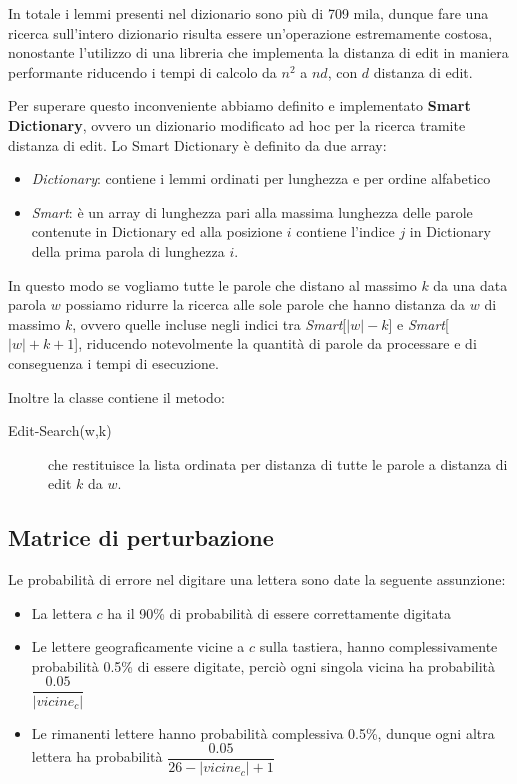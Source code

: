In totale i lemmi presenti nel dizionario sono pi\`u di 709 mila,
dunque fare una ricerca sull'intero dizionario risulta essere 
un'operazione estremamente costosa, nonostante l'utilizzo di una
libreria che implementa la distanza di edit in maniera performante
riducendo i tempi di calcolo da $n^2$ a $nd$, con $d$ distanza di 
edit.

Per superare questo inconveniente abbiamo definito e implementato 
\textbf{Smart Dictionary}, ovvero un dizionario modificato ad hoc per
la ricerca tramite distanza di edit. Lo Smart Dictionary \`e definito 
da due array:
\begin{itemize}
  \item \textit{Dictionary}: contiene i lemmi ordinati per lunghezza e per 
  ordine alfabetico
  \item \textit{Smart}: \`e un array di lunghezza pari alla massima 
  lunghezza delle parole contenute in Dictionary ed alla posizione $i$
  contiene l'indice $j$ in Dictionary della prima parola di lunghezza $i$. 
\end{itemize}

In questo modo se vogliamo tutte le parole che distano al massimo $k$ 
da una data parola $w$ possiamo ridurre la ricerca alle sole
parole che hanno distanza da $w$ di massimo $k$, ovvero quelle 
incluse negli indici tra \textit{Smart}[$|w| -k$] e 
\textit{Smart}[$|w| +k +1$], riducendo notevolmente la quantit\`a di 
parole da processare e di conseguenza i tempi di esecuzione.

Inoltre la classe contiene il metodo:
\begin{description}
  \item[Edit-Search(w,k)] che restituisce la lista ordinata per 
  distanza di tutte le parole a distanza di edit $k$ da $w$. 
\end{description}

\subsection{Matrice di perturbazione}
\label{sec:pertu}
Le probabilit\`a di errore nel digitare una lettera sono date la
seguente assunzione:
\begin{itemize}
  \item La lettera $c$ ha il 90\% di probabilit\`a di essere 
  correttamente digitata
  \item Le lettere geograficamente vicine a $c$ sulla tastiera, hanno
  complessivamente probabilit\`a 0.5\% di essere digitate, perci\`o 
  ogni singola vicina ha probabilit\`a $\dfrac{0.05}{|vicine_c|}$
  \item Le rimanenti lettere hanno probabilit\`a complessiva 0.5\%, 
  dunque ogni altra lettera ha probabilit\`a $\dfrac{0.05}{26 - |vicine_c| + 1}$
\end{itemize}

